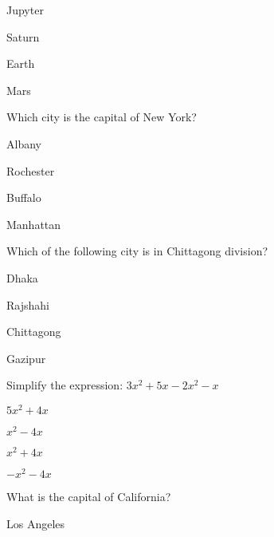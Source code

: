 \documentclass[12pt]{exam}
\begin{document}
\begin{questions}
\begin{oneparchoices}
            \choice Jupyter
        
            \choice Saturn
        
            \choice Earth
        
            \choice Mars
        
        \end{oneparchoices}

    \question Which city is the capital of New York?
    
        \begin{oneparchoices}
        
            \choice Albany
        
            \choice Rochester
        
            \choice Buffalo
        
            \choice Manhattan
        
        \end{oneparchoices}

    \question Which of the following city is in Chittagong division?
    
        \begin{oneparchoices}
        
            \choice Dhaka
        
            \choice Rajshahi
        
            \choice Chittagong
        
            \choice Gazipur
        
        \end{oneparchoices}

    \question Simplify the expression: $3x^2 + 5x - 2x^2 - x$
    
        \begin{oneparchoices}
        
            \choice $5x^2 + 4x$
        
            \choice $x^2 - 4x$
        
            \choice $x^2 + 4x$
        
            \choice $-x^2 - 4x$
        
        \end{oneparchoices}

    \question What is the capital of California?
    
        \begin{oneparchoices}
        
            \choice Los Angeles
        

\end{oneparchoices}
\end{questions}
\end{document}

